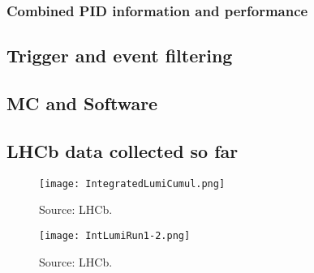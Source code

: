 \subsubsection{Combined PID information and performance}

\subsection{Trigger and event filtering}

\subsection{MC and Software}

\subsection{LHCb data collected so far}

\begin{figure}[tb] 
  \centering    
  \texttt{[image: IntegratedLumiCumul.png]}
  \caption{Source: LHCb.}
  \label{fig:cumulative_lumi}
\end{figure}

\begin{figure}[tb] 
  \centering    
  \texttt{[image: IntLumiRun1-2.png]}
  \caption{Source: LHCb.}
  \label{fig:yearly_lumi}
\end{figure}
